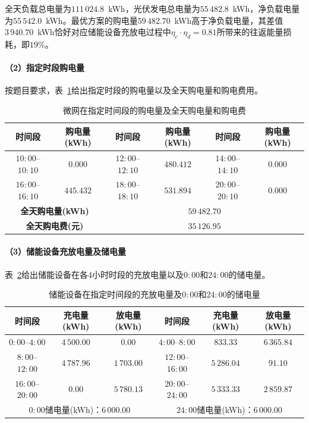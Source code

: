 \documentclass[12pt,a4paper]{ctexart}
\theoremstyle{definition}
\theoremstyle{plain}
\theoremstyle{remark}
\begin{document}
全天负载总电量为$111\,024.8$~kWh，光伏发电总电量为$55\,482.8$~kWh，净负载电量为$55\,542.0$~kWh。最优方案的购电量$59\,482.70$~kWh高于净负载电量，其差值$3\,940.70$~kWh恰好对应储能设备充放电过程中$\eta_c \cdot \eta_d = 0.81$所带来的往返能量损耗，即$19\%$。

\paragraph{（2）指定时段购电量}

按题目要求，表~\ref{tab:q1_purchase_specified}给出指定时段的购电量以及全天购电量和购电费用。

\begin{table}[H]
\centering
\caption{微网在指定时间段的购电量及全天购电量和购电费}
\label{tab:q1_purchase_specified}
\begin{tabular}{cc|cc|cc}
\toprule
\textbf{时间段} & \textbf{购电量(kWh)} & \textbf{时间段} & \textbf{购电量(kWh)} & \textbf{时间段} & \textbf{购电量(kWh)} \\
\midrule
$10{:}00$--$10{:}10$ & $0.000$ & $12{:}00$--$12{:}10$ & $480.412$ & $14{:}00$--$14{:}10$ & $0.000$ \\
$16{:}00$--$16{:}10$ & $445.432$ & $18{:}00$--$18{:}10$ & $531.894$ & $20{:}00$--$20{:}10$ & $0.000$ \\
\midrule
\multicolumn{2}{c|}{\textbf{全天购电量(kWh)}} & \multicolumn{4}{c}{$59\,482.70$} \\
\multicolumn{2}{c|}{\textbf{全天购电费(元)}} & \multicolumn{4}{c}{$35\,126.95$} \\
\bottomrule
\end{tabular}
\end{table}

\paragraph{（3）储能设备充放电量及储电量}

表~\ref{tab:q1_storage}给出储能设备在各4小时时段的充放电量以及$0{:}00$和$24{:}00$的储电量。

\begin{table}[H]
\centering
\caption{储能设备在指定时间段的充放电量及$0{:}00$和$24{:}00$的储电量}
\label{tab:q1_storage}
\begin{tabular}{ccc|ccc}
\toprule
\textbf{时间段} & \textbf{充电量(kWh)} & \textbf{放电量(kWh)} & \textbf{时间段} & \textbf{充电量(kWh)} & \textbf{放电量(kWh)} \\
\midrule
$0{:}00$--$4{:}00$   & $4\,500.00$ & $0.00$      & $4{:}00$--$8{:}00$   & $833.33$    & $6\,365.84$ \\
$8{:}00$--$12{:}00$  & $4\,787.96$ & $1\,703.00$ & $12{:}00$--$16{:}00$ & $5\,286.04$ & $91.10$     \\
$16{:}00$--$20{:}00$ & $0.00$      & $5\,780.13$ & $20{:}00$--$24{:}00$ & $5\,333.33$ & $2\,859.87$ \\
\midrule
\multicolumn{3}{c|}{$0{:}00$储电量\;(kWh)：$6\,000.00$} & \multicolumn{3}{c}{$24{:}00$储电量\;(kWh)：$6\,000.00$} \\
\bottomrule
\end{tabular}
\end{table}
\end{document}
